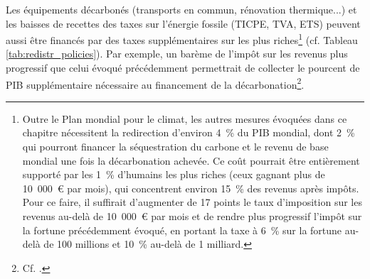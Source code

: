 \documentclass[a5paper,french,openany]{memoir}
\begin{document}
Les équipements décarbonés (transports en commun, rénovation thermique...) et les baisses de recettes des taxes sur l'énergie fossile (TICPE, TVA, ETS) peuvent aussi être financés par des taxes supplémentaires sur les plus riches\footnote{Outre le Plan mondial pour le climat, les autres mesures évoquées dans ce chapitre nécessitent la redirection d'environ 4~\% du PIB mondial, dont 2~\% qui pourront financer la séquestration du carbone et le revenu de base mondial une fois la décarbonation achevée. %
Ce coût pourrait être entièrement supporté par les 1~\% d'humains les plus riches (ceux gagnant plus de 10~000~\euro{} par mois), qui concentrent environ 15~\% des revenus après impôts. Pour ce faire, il suffirait d'augmenter de 17 points le taux d'imposition sur les revenus au-delà de 10~000~\euro{} par mois et de rendre plus progressif l'impôt sur la fortune précédemment évoqué, en portant la taxe à 6~\% sur la fortune au-delà de 100 millions et 10~\% au-delà de 1 milliard.%
} (cf. Tableau \ref{tab:redistr_policies}). 
Par exemple, un barème de l'impôt sur les revenus %
plus progressif que celui évoqué précédemment permettrait de collecter le pourcent de PIB supplémentaire nécessaire au financement de la décarbonation\footnote{Cf. \cite{aie_net_2021}.}. 
\end{document}
